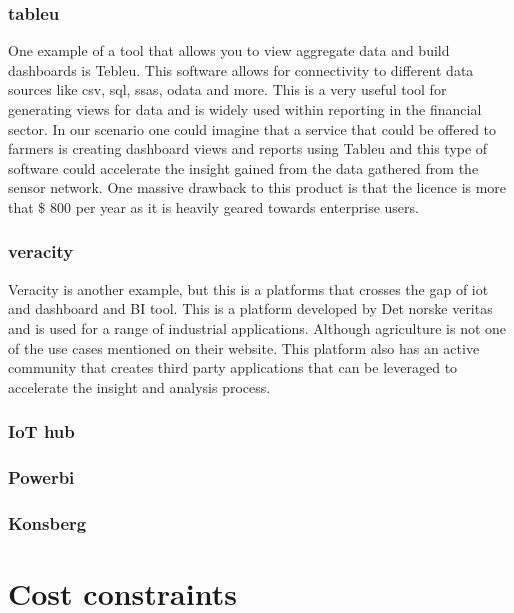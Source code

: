 \documentclass[]{uiophd}
\begin{document}
\subsection{tableu}
One example of a tool that allows you to view aggregate data and build dashboards is Tebleu. This software allows for connectivity to different data sources like csv, sql, ssas, odata and more. This is a very useful tool for generating views for data and is widely used within reporting in the financial sector. In our scenario one could imagine that a service that could be offered to farmers is creating dashboard views and reports using Tableu and  this type of software could accelerate the insight gained from the data gathered from the sensor network. One massive drawback to this product is that the licence is more that \$ 800 per year as it is heavily geared towards enterprise users.

\subsection{veracity}
Veracity is another example, but this is a platforms that crosses the gap of iot and dashboard and BI tool. This is a platform developed by Det norske veritas and is used for a range of industrial applications. Although agriculture is not one of the use cases mentioned on their website. This platform also has an active community that creates third party applications that can be leveraged to accelerate the insight and analysis process. 

\subsection{IoT hub}

\subsection{Powerbi}

\subsection{Konsberg}

\chapter{Cost constraints}
\end{document}
